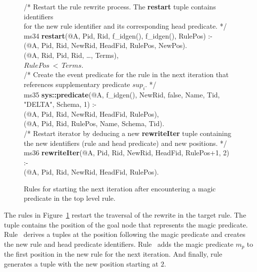 \begin{figure}[!t]
\ssp
\centering
\begin{boxedminipage}{\linewidth}
/* Restart the rule rewrite process. The {\bf restart} tuple contains identifiers  \\
for the new rule identifier and its corresponding head predicate. */ \\
ms34 {\bf restart}(@A, Pid, Rid, f\_idgen(), f\_idgen(), RulePos) :- \\
(@A, Pid, Rid, NewRid, HeadFid, RulePos, NewPos). \\
(@A, Rid, Pid, Rid, \ldots, Terms), \\
\datalogspace $RulePos\ <\ Terms$. \\
	
/* Create the event predicate for the rule in the next iteration that  \\
references supplementary predicate $sup_i$. */ \\
ms35 {\bf sys::predicate}(@A, f\_idgen(), NewRid, false, Name, Tid, "DELTA", Schema, 1) :- \\
(@A, Pid, Rid, NewRid, HeadFid, RulePos), \\
(@A, Pid, Rid, RulePos, Name, Schema, Tid). \\
	
/* Restart iterator by deducing a new {\bf rewriteIter} tuple containing \\
the new identifiers (rule and head predicate) and new positions. */ \\
ms36 {\bf rewriteIter}(@A, Pid, Rid, NewRid, HeadFid, RulePos+1, 2) :- \\
(@A, Pid, Rid, NewRid, HeadFid, RulePos).

\end{boxedminipage}
\caption{\label{ch:magic:fig:rewrite8}Rules for starting the next iteration after
encountering a magic predicate in the top level rule. }
\end{figure}

The rules in Figure~\ref{ch:magic:fig:rewrite8} restart the traversal of the
rewrite in the target rule.  The  tuple contains the position of the
goal node that represents the magic predicate.  Rule~ derives a
 tuples at the position following the magic predicate and creates
the new rule and head predicate identifiers.  Rule~ adds the magic
predicate $m_p$ to the first position in the new rule for the next iteration.
And finally, rule~ generates a  tuple with the new
position starting at $2$.

